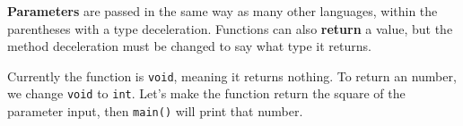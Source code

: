 		\textbf{Parameters} are passed in the same way as many other languages, within the parentheses with a type deceleration. Functions can also \textbf{return} a value, but the method deceleration must be changed to say what type it returns.
		
		Currently the function is \texttt{void}, meaning it returns nothing. To return an number, we change \texttt{void} to \texttt{int}. Let's make the function return the square of the parameter input, then \texttt{main()} will print that number.
		
		
	
	